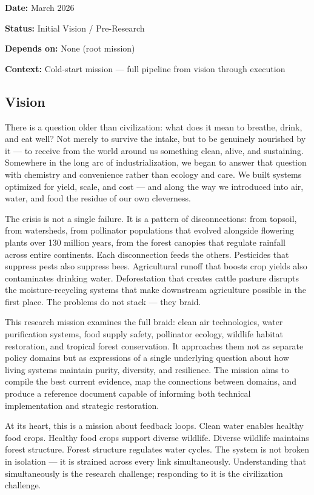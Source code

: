 \documentclass[11pt,letterpaper]{article}
\newcommand{\metafield}[2]{\textbf{\sffamily #1} #2\par}
\begin{document}
\metafield{Date:}{March 2026}
\metafield{Status:}{Initial Vision / Pre-Research}
\metafield{Depends on:}{None (root mission)}
\metafield{Context:}{Cold-start mission --- full pipeline from vision through execution}

\subsection{Vision}

There is a question older than civilization: what does it mean to breathe, drink, and eat well? Not merely to survive the intake, but to be genuinely nourished by it --- to receive from the world around us something clean, alive, and sustaining. Somewhere in the long arc of industrialization, we began to answer that question with chemistry and convenience rather than ecology and care. We built systems optimized for yield, scale, and cost --- and along the way we introduced into air, water, and food the residue of our own cleverness.

The crisis is not a single failure. It is a pattern of disconnections: from topsoil, from watersheds, from pollinator populations that evolved alongside flowering plants over 130 million years, from the forest canopies that regulate rainfall across entire continents. Each disconnection feeds the others. Pesticides that suppress pests also suppress bees. Agricultural runoff that boosts crop yields also contaminates drinking water. Deforestation that creates cattle pasture disrupts the moisture-recycling systems that make downstream agriculture possible in the first place. The problems do not stack --- they braid.

This research mission examines the full braid: clean air technologies, water purification systems, food supply safety, pollinator ecology, wildlife habitat restoration, and tropical forest conservation. It approaches them not as separate policy domains but as expressions of a single underlying question about how living systems maintain purity, diversity, and resilience. The mission aims to compile the best current evidence, map the connections between domains, and produce a reference document capable of informing both technical implementation and strategic restoration.

At its heart, this is a mission about feedback loops. Clean water enables healthy food crops. Healthy food crops support diverse wildlife. Diverse wildlife maintains forest structure. Forest structure regulates water cycles. The system is not broken in isolation --- it is strained across every link simultaneously. Understanding that simultaneously is the research challenge; responding to it is the civilization challenge.
\end{document}
